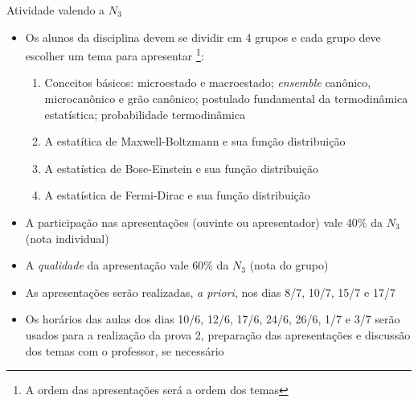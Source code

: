 \documentclass[t,%
brazilian,%
11pt,%
aspectratio=169,%
table%
]{beamer}
\begin{document}

 \begin{frame}{Atividade valendo a \(N_3\)}
     \begin{itemize}
         \item Os alunos da disciplina devem se dividir em 4 grupos e cada grupo deve escolher um tema para
             apresentar \footnote{A ordem das apresentações será a ordem dos temas}:
             \begin{enumerate}
                 \item Conceitos básicos: microestado e macroestado; \textit{ensemble} canônico,
                     microcanônico e grão canônico; postulado fundamental da termodinâmica estatística;
                     probabilidade termodinâmica
                 \item A estatítica  de Maxwell-Boltzmann e sua função distribuição
                 \item A estatística de Bose-Einstein e sua função distribuição
                 \item A estatística de Fermi-Dirac e sua função distribuição
             \end{enumerate}
         \item A participação nas apresentações (ouvinte ou apresentador) vale 40\% da \(N_3\) (nota individual)
         \item A \textit{qualidade} da apresentação vale 60\% da \(N_3\) (nota do grupo)
         \item As apresentações serão realizadas, \textit{a priori}, nos dias 8/7, 10/7, 15/7 e 17/7
         \item Os horários das aulas dos dias 10/6, 12/6, 17/6, 24/6, 26/6, 1/7 e 3/7 serão usados para 
             a realização da prova 2,  preparação das apresentações e discussão dos temas com o professor, se necessário
     \end{itemize}
 \end{frame}
\end{document}
